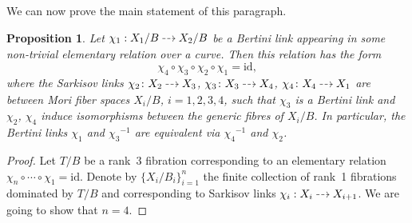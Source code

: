\documentclass[JEP,XML,SOM,Unicode,NoFloatCountersInSection]{cedram}
\newcommand{\dradpl}{{\hspace*{-2mm}\begin{tikzcd}[ampersand replacement=\&,column sep = scriptsize]\mbox{}\ar[r,dashed]\&\mbox{}\end{tikzcd}\hspace*{-2mm}}}
\newcommand{\dratst}{{\hspace*{-2mm}\begin{tikzcd}[ampersand replacement=\&,column sep = small]\mbox{}\ar[r,dashed]\&\mbox{}\end{tikzcd}\hspace*{-2mm}}}
\let\drascst\dratst
\newcommand{\dra}{\mathchoice{\dradpl}{\dratst}{\drascst}{\drascst}}
\theoremstyle{plain}
\newtheorem{prop}[thm]{Proposition}
\theoremstyle{definition}
\newcommand{\id}{\mathrm{id}}
\begin{document}
We can now prove the main statement of this paragraph.

\begin{prop}\label{prop: relation form}
Let $\chi_1: X_1/B\dra X_2/B$ be a Bertini link appearing in some non-trivial elementary relation over a curve. Then this relation has the form
\[
\chi_4\circ\chi_3\circ\chi_2\circ \chi_1=\id,
\]
where the Sarkisov links $\chi_2\colon X_2\dra X_3$, $\chi_3\colon X_3\dra X_4$, $\chi_4\colon X_4\dra X_1$ are between Mori fiber spaces $X_i/B$, $i=1,2,3,4$, such that $\chi_3$ is a Bertini link and $\chi_2$, $\chi_4$ induce isomorphisms between the generic fibres of $X_i/B$. In particular, the Bertini links $\chi_1$ and ${\chi_3}^{-1}$ are equivalent via ${\chi_4}^{-1}$ and $\chi_2$.
\end{prop}
\begin{proof}
Let $T/B$ be a rank~$3$ fibration corresponding to an elementary relation $\chi_n\circ\cdots\circ\chi_1=\id$. Denote by $\{X_i/B_i\}_{i=1}^n$ the finite collection of rank~1 fibrations dominated by $T/B$ and corresponding to Sarkisov links $\chi_i: X_i\dra X_{i+1}$. We are going to show that $n=4$.


\end{proof}
\end{document}
